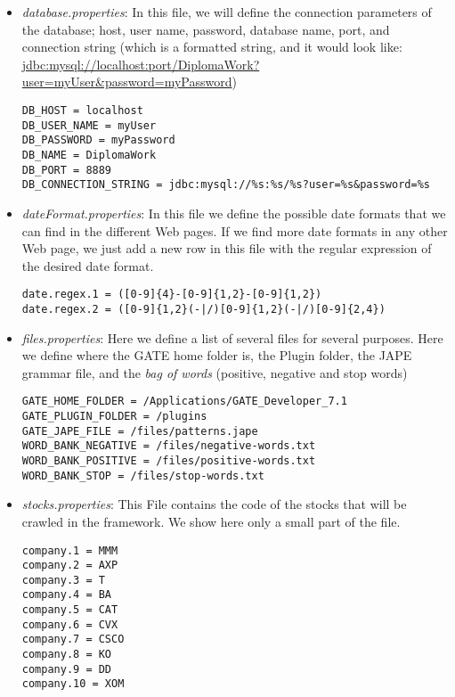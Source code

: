 \begin{itemize}
	\item \emph{database.properties}: In this file, we will define the connection parameters of the database; host, user name, password, database name, port, and connection string (which is a formatted string, and it would look like:  \url{jdbc:mysql://localhost:port/DiplomaWork?user=myUser&password=myPassword})

\begin{lstlisting}
DB_HOST = localhost
DB_USER_NAME = myUser
DB_PASSWORD = myPassword
DB_NAME = DiplomaWork
DB_PORT = 8889
DB_CONNECTION_STRING = jdbc:mysql://%s:%s/%s?user=%s&password=%s
\end{lstlisting}

	\item \emph{dateFormat.properties}: In this file we define the possible date formats that we can find in the different Web pages. If we find more date formats in any other Web page, we just add a new row in this file with the regular expression of the desired date format.
	
\begin{lstlisting}
date.regex.1 = ([0-9]{4}-[0-9]{1,2}-[0-9]{1,2})
date.regex.2 = ([0-9]{1,2}(-|/)[0-9]{1,2}(-|/)[0-9]{2,4})
\end{lstlisting}

	\item \emph{files.properties}: Here we define a list of several files for several purposes. Here we define where the GATE home folder is, the Plugin folder, the JAPE grammar file, and the \emph{bag of words} (positive, negative and stop words)

\begin{lstlisting}
GATE_HOME_FOLDER = /Applications/GATE_Developer_7.1
GATE_PLUGIN_FOLDER = /plugins
GATE_JAPE_FILE = /files/patterns.jape
WORD_BANK_NEGATIVE = /files/negative-words.txt
WORD_BANK_POSITIVE = /files/positive-words.txt
WORD_BANK_STOP = /files/stop-words.txt
\end{lstlisting}

	\item \emph{stocks.properties}\label{stocks.properties}: This File contains the code of the stocks that will be crawled in the framework. We show here only a small part of the file. 
	
\begin{lstlisting}
company.1 = MMM
company.2 = AXP
company.3 = T
company.4 = BA
company.5 = CAT
company.6 = CVX
company.7 = CSCO
company.8 = KO
company.9 = DD
company.10 = XOM
\end{lstlisting}


\end{itemize}
